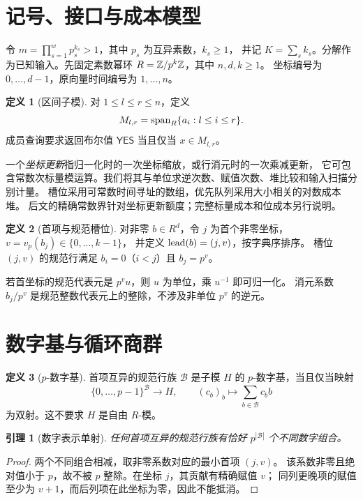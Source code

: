 \documentclass[11pt,a4paper,fontset=fandol]{ctexart}
\theoremstyle{definition}
\newtheorem{definition}{定义}
\theoremstyle{plain}
\newtheorem{lemma}{引理}
\begin{document}
\section{记号、接口与成本模型}
令 $m=\prod_{s=1}^w p_s^{k_s}>1$，其中 $p_s$ 为互异素数，$k_s\ge1$，
并记 $K=\sum_s k_s$。分解作为已知输入。先固定素数幂环 $R=\mathbb Z/p^k\mathbb Z$，其中 $n,d,k\ge1$。
坐标编号为 $0,\ldots,d-1$，原向量时间编号为 $1,\ldots,n$。

\begin{definition}[区间子模]\label{def:interval}
对 $1\le l\le r\le n$，定义
\[
 M_{l,r}=\operatorname{span}_R\{a_i:l\le i\le r\}.
\]
成员查询要求返回布尔值 $\mathsf{YES}$ 当且仅当 $x\in M_{l,r}$。
\end{definition}

一个\emph{坐标更新}指归一化时的一次坐标缩放，或行消元时的一次乘减更新，
它可包含常数次标量模运算。我们将其与单位求逆次数、赋值次数、堆比较和输入扫描分别计量。
槽位采用可常数时间寻址的数组，优先队列采用大小相关的对数成本堆。
后文的精确常数界针对坐标更新额度；完整标量成本和位成本另行说明。

\begin{definition}[首项与规范槽位]\label{def:lead}
对非零 $b\in R^d$，令 $j$ 为首个非零坐标，$v=v_p(b_j)\in\{0,\ldots,k-1\}$，
并定义 $\operatorname{lead}(b)=(j,v)$，按字典序排序。
槽位 $(j,v)$ 的规范行满足 $b_i=0$（$i<j$）且 $b_j=p^v$。
\end{definition}

若首坐标的规范代表元是 $p^v u$，则 $u$ 为单位，乘 $u^{-1}$ 即可归一化。
消元系数 $b_j/p^v$ 是规范整数代表元上的整除，不涉及非单位 $p^v$ 的逆元。

\section{数字基与循环商群}
\begin{definition}[$p$-数字基]\label{def:digit}
首项互异的规范行族 $\mathcal B$ 是子模 $H$ 的 $p$-数字基，当且仅当映射
\[
 \{0,\ldots,p-1\}^{\mathcal B}\longrightarrow H,
 \qquad(c_b)_b\longmapsto\sum_{b\in\mathcal B}c_b b
\]
为双射。这不要求 $H$ 是自由 $R$-模。
\end{definition}

\begin{lemma}[数字表示单射]\label{lem:digits}
任何首项互异的规范行族有恰好 $p^{|\mathcal B|}$ 个不同数字组合。
\end{lemma}
\begin{proof}
两个不同组合相减，取非零系数对应的最小首项 $(j,v)$。
该系数非零且绝对值小于 $p$，故不被 $p$ 整除。在坐标 $j$，其贡献有精确赋值 $v$；
同列更晚项的赋值至少为 $v+1$，而后列项在此坐标为零，因此不能抵消。
\end{proof}
\end{document}
